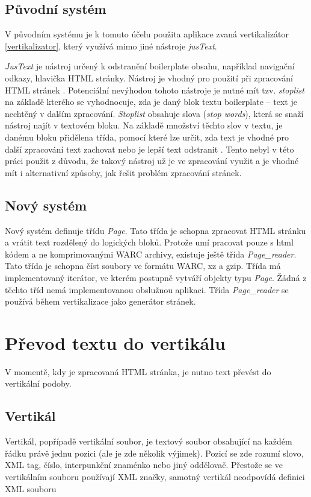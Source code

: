 \section{Původní systém}
V původním systému je k tomuto účelu použita aplikace zvaná vertikalizátor \ref{vertikalizator}, který využívá
mimo jiné nástroje \textit{jusText}.

\label{jusText}
\textit{JusText} je nástroj určený k odstranění boilerplate obsahu, například navigační odkazy, hlavička HTML stránky.
Nástroj je vhodný pro použití při zpracování HTML stránek \cite{JUSTEXT}. Potenciální nevýhodou tohoto nástroje je nutné mít tzv. \textit{stoplist}
na základě kterého se vyhodnocuje, zda je daný blok textu boilerplate -- text je nechtěný v dalším zpracování. \textit{Stoplist}
obsahuje slova (\textit{stop words}), která se snaží nástroj najít v textovém bloku. Na základě množství těchto slov v textu,
je danému bloku přidělena třída, pomocí které lze určit, zda text je vhodné pro další zpracování text zachovat nebo je lepší
text odstranit \cite{JUSTEXT_ALG}. Tento nebyl v této práci použit z důvodu, že takový nástroj už je ve zpracování využit a
je vhodné mít i alternativní způsoby, jak řešit problém zpracování stránek.

\section{Nový systém}
Nový systém definuje třídu \textit{Page}. Tato třída je schopna zpracovat HTML stránku a vrátit text rozdělený do logických
bloků. Protože umí pracovat pouze s html kódem a ne komprimovanými WARC archivy, existuje ještě třída \textit{Page\_reader}.
Tato třída je schopna číst soubory ve formátu WARC, xz a gzip. Třída má implementovaný iterátor, ve kterém postupně vytváří
objekty typu \textit{Page}.
Žádná z těchto tříd nemá implementovanou obslužnou aplikaci. Třída \textit{Page\_reader} se používá během vertikalizace
jako generátor stránek.

\chapter{Převod textu do vertikálu} %
\label{vertikalizace}
V momentě, kdy je zpracovaná HTML stránka, je nutno text převést do vertikální podoby.

\section{Vertikál}
Vertikál, popřípadě vertikální soubor, je textový soubor obsahující na každém řádku právě jednu pozici (ale je zde několik výjimek).
Pozicí se zde rozumí slovo, XML tag, číslo, interpunkční znaménko nebo jiný oddělovač. Přestože se ve vertikálním
souboru používají XML značky, samotný vertikál neodpovídá definici XML souboru \cite{VERTIKAL}

